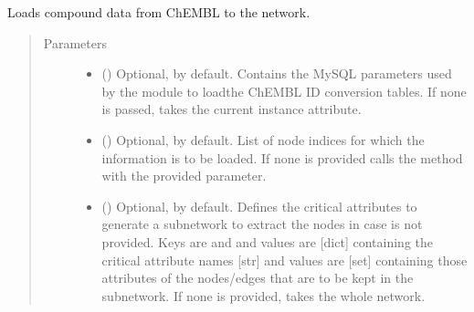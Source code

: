 \documentclass[letterpaper,10pt,english]{sphinxmanual}
\begin{document}
\begin{fulllineitems}

\begin{fulllineitems}
\label{\detokenize{reference:pypath.main.PyPath.complexes_in_network}}
\end{fulllineitems}


\begin{fulllineitems}
\label{\detokenize{reference:pypath.main.PyPath.compounds_from_chembl}}
Loads compound data from ChEMBL to the network.
\begin{quote}\begin{description}
\item[{Parameters}] \leavevmode\begin{itemize}
\item {} 
 () \textendash{} Optional,  by default. Contains the MySQL parameters
used by the  module to loadthe
ChEMBL ID conversion tables. If none is passed, takes the
current instance 
attribute.

\item {} 
 () \textendash{} Optional,  by default. List of node indices for
which the information is to be loaded. If none is provided
calls the method {\hyperref[\detokenize{reference:pypath.main.PyPath.get_sub}]{}} with
the provided  parameter.

\item {} 
 () \textendash{} Optional,  by default. Defines the critical
attributes to generate a subnetwork to extract the nodes in
case  is not provided. Keys are  and
 and values are {[}dict{]} containing the critical
attribute names {[}str{]} and values are {[}set{]} containing those
attributes of the nodes/edges that are to be kept in the
subnetwork. If none is provided, takes the whole network.


\end{itemize}
\end{description}
\end{quote}
\end{fulllineitems}
\end{fulllineitems}
\end{document}
